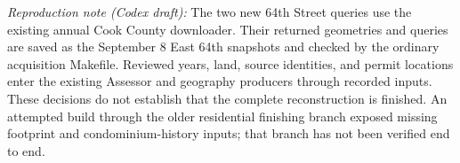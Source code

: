 \smallskip
\noindent\textit{Reproduction note (Codex draft):} The two new 64th Street queries use the existing annual Cook County downloader. Their returned geometries and queries are saved as the September 8 East 64th snapshots and checked by the ordinary acquisition Makefile. Reviewed years, land, source identities, and permit locations enter the existing Assessor and geography producers through recorded inputs. These decisions do not establish that the complete reconstruction is finished. An attempted build through the older residential finishing branch exposed missing footprint and condominium-history inputs; that branch has not been verified end to end.
